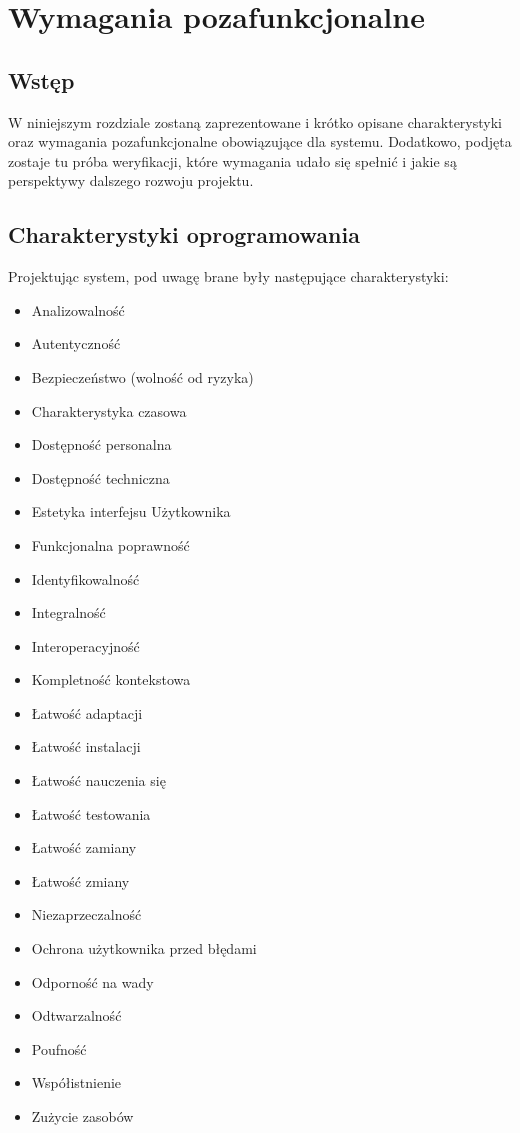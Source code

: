 \chapter{Wymagania pozafunkcjonalne}
\label{Chapter4}

\section{Wstęp}
\label{Chapter41}

W niniejszym rozdziale zostaną zaprezentowane i krótko opisane charakterystyki oraz wymagania pozafunkcjonalne obowiązujące dla systemu. Dodatkowo, podjęta zostaje tu próba weryfikacji, które wymagania udało się spełnić i jakie są perspektywy dalszego rozwoju projektu.

\section{Charakterystyki oprogramowania}
\label{Chapter42}

Projektując system, pod uwagę brane były następujące charakterystyki:

\begin{itemize}
\item{Analizowalność}
\item{Autentyczność}
\item{Bezpieczeństwo (wolność od ryzyka)}
\item{Charakterystyka czasowa}
\item{Dostępność personalna}
\item{Dostępność techniczna}
\item{Estetyka interfejsu Użytkownika}
\item{Funkcjonalna poprawność}
\item{Identyfikowalność}
\item{Integralność}
\item{Interoperacyjność}
\item{Kompletność kontekstowa}
\item{Łatwość adaptacji}
\item{Łatwość instalacji}
\item{Łatwość nauczenia się}
\item{Łatwość testowania}
\item{Łatwość zamiany}
\item{Łatwość zmiany}
\item{Niezaprzeczalność}
\item{Ochrona użytkownika przed błędami}
\item{Odporność na wady}
\item{Odtwarzalność}
\item{Poufność}
\item{Współistnienie}
\item{Zużycie zasobów}
\end{itemize}

